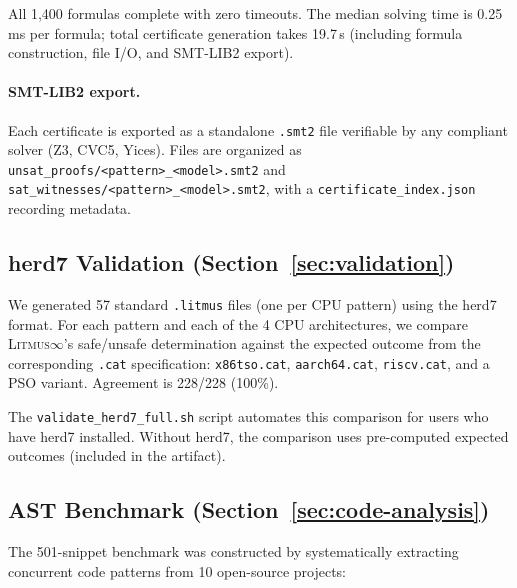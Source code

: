 \documentclass[11pt]{article}
\newcommand{\litmus}{\textsc{Litmus$\infty$}}
\begin{document}
All 1{,}400 formulas complete with zero timeouts.  The median solving time
is 0.25\,ms per formula; total certificate generation takes 19.7\,s
(including formula construction, file I/O, and SMT-LIB2 export).

\paragraph{SMT-LIB2 export.}
Each certificate is exported as a standalone \texttt{.smt2} file
verifiable by any compliant solver (Z3, CVC5, Yices).
Files are organized as
\texttt{unsat\_proofs/\allowbreak<pattern>\_\allowbreak<model>.smt2}
and \texttt{sat\_witnesses/\allowbreak<pattern>\_\allowbreak<model>.smt2},
with a \texttt{certificate\_index.json} recording metadata.

\subsection{herd7 Validation (Section~\ref{sec:validation})}

We generated 57 standard \texttt{.litmus} files (one per CPU pattern)
using the herd7 format.  For each pattern and each of the 4 CPU
architectures, we compare \litmus{}'s safe/unsafe determination against
the expected outcome from the corresponding \texttt{.cat} specification:
\texttt{x86tso.cat}, \texttt{aarch64.cat}, \texttt{riscv.cat}, and
a PSO variant.  Agreement is 228/228 (100\%).

The \texttt{validate\_herd7\_full.sh} script automates this comparison
for users who have herd7 installed.  Without herd7, the comparison
uses pre-computed expected outcomes (included in the artifact).

\subsection{AST Benchmark (Section~\ref{sec:code-analysis})}

The 501-snippet benchmark was constructed by systematically extracting
concurrent code patterns from 10 open-source projects:
\end{document}
